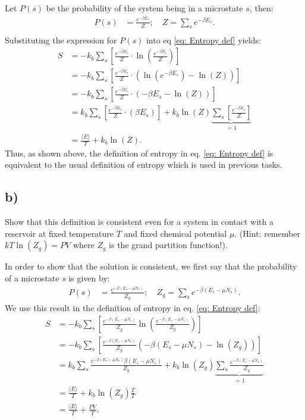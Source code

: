 \documentclass[a4paper]{article}
\newcommand{\average}[1]{\langle #1 \rangle}
\newcommand{\newparagraph}{\vspace{.5cm}\noindent}
\begin{document}
\newparagraph
Let $P(s)$ be the probability of the system being in a microstate $s$, then:
\begin{align*}
    P(s) &= \frac{e^{-\beta E_s}}{Z}; \quad Z = \sum_s e^{-\beta E_s}.\\
\end{align*}Substituting the expression for $P(s)$ into eq \eqref{eq: Entropy def} yields:
\begin{align*}
    S&= -k_b\sum_s \left[\frac{e^{-\beta E_s}}{Z}\cdot \ln\left(\frac{e^{-\beta E_s}}{Z}\right)\right]\\
    &= -k_b\sum_s \left[\frac{e^{-\beta E_s}}{Z}\cdot\left(\ln\left(e^{-\beta E_s}\right) - \ln\left(Z\right)\right)\right]\\
    &= -k_b\sum_s\left[\frac{e^{-\beta E_s}}{Z}\cdot\left(-\beta E_s - \ln\left(Z\right)\right)\right]\\
    &= k_b\sum_s\left[\frac{e^{-\beta E_s}}{Z}\cdot\left(\beta E_s\right)\right] + k_b\ln(Z)\underbrace{\sum_s\left[\frac{e^{-\beta E_s}}{Z}\right]}_{=1}\\
    &= \frac{\average{E}}{T} + k_b\ln\left(Z\right).
\end{align*}Thus, as shown above, the definition of entropy in eq. \eqref{eq: Entropy def} is equivalent to the usual definition of entropy which is used in previous tasks.

\subsection*{b)}
Show that this definition is consistent even for a system in contact with a reservoir at fixed temperature $T$ and fixed chemical potential $\mu$. (Hint: remember $kT\ln(Z_g)=PV$ where $Z_g$ is the grand partition function!).

\newparagraph
In order to show that the solution is consistent, we first say that the probability of a microstate $s$ is given by:
\begin{align*}
    P(s) &= \frac{e^{-\beta(E_s - \mu N_s)}}{Z_g}; \quad Z_g = \sum_s e^{-\beta(E_s - \mu N_s)}.
\end{align*}We use this result in the definition of entropy in eq. \eqref{eq: Entropy def}:
\begin{align*}
    S&=-k_b\sum_s\left[\frac{e^{-\beta(E_s - \mu N_s)}}{Z_g}\ln\left(\frac{e^{-\beta(E_s - \mu N_s)}}{Z_g}\right)\right]\\
    &=-k_b\sum_s\left[\frac{e^{-\beta(E_s - \mu N_s)}}{Z_g}\left(-\beta(E_s - \mu N_s)-\ln\left(Z_g\right)\right)\right]\\
    &= k_b\sum_s\frac{e^{-\beta(E_s-\mu N_s)}\beta(E_s -\mu N_s)}{Z_g} + k_b\ln(Z_g)\underbrace{\sum_s \frac{e^{-\beta(E_s - \mu N_s)}}{Z_g}}_{=1}\\
    &= \frac{\average{E}}{T} + k_b\ln(Z_g)\frac{T}{T}\\
    &= \frac{\average{E}}{T} + \frac{PV}{T}.
\end{align*}
\end{document}
